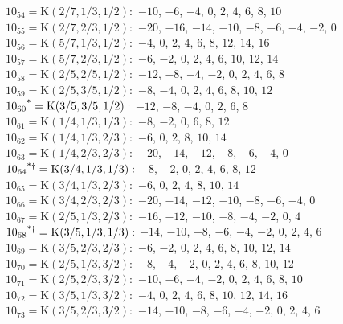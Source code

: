 $10_{54} = \mathrm{K}(2/7, 1/3, 1/2):$  $-10$, $-6$, $-4$, $0$, $2$, $4$, $6$, $8$, $10$\\ 
$10_{55} = \mathrm{K}(2/7, 2/3, 1/2):$  $-20$, $-16$, $-14$, $-10$, $-8$, $-6$, $-4$, $-2$, $0$\\ 
$10_{56} = \mathrm{K}(5/7, 1/3, 1/2):$  $-4$, $0$, $2$, $4$, $6$, $8$, $12$, $14$, $16$\\ 
$10_{57} = \mathrm{K}(5/7, 2/3, 1/2):$  $-6$, $-2$, $0$, $2$, $4$, $6$, $10$, $12$, $14$\\ 
$10_{58} = \mathrm{K}(2/5, 2/5, 1/2 ):$  $-12$, $-8$, $-4$, $-2$, $0$, $2$, $4$, $6$, $8$\\ 
$10_{59} = \mathrm{K}(2/5, 3/5, 1/2):$  $-8$, $-4$, $0$, $2$, $4$, $6$, $8$, $10$, $12$\\ 
$10_{60}\textsuperscript{*} = \mathrm{K}(3/5, 3/5, 1/2):$  $-12$, $-8$, $-4$, $0$, $2$, $6$, $8$\\ 
$10_{61} = \mathrm{K}(1/4, 1/3, 1/3):$  $-8$, $-2$, $0$, $6$, $8$, $12$\\ 
$10_{62} = \mathrm{K}(1/4, 1/3, 2/3):$  $-6$, $0$, $2$, $8$, $10$, $14$\\ 
$10_{63} = \mathrm{K}(1/4, 2/3, 2/3):$  $-20$, $-14$, $-12$, $-8$, $-6$, $-4$, $0$\\ 
$10_{64}\textsuperscript{*$\dagger$} = \mathrm{K}(3/4, 1/3, 1/3):$  $-8$, $-2$, $0$, $2$, $4$, $6$, $8$, $12$\\ 
$10_{65} = \mathrm{K}(3/4, 1/3, 2/3):$  $-6$, $0$, $2$, $4$, $8$, $10$, $14$\\ 
$10_{66} = \mathrm{K}(3/4, 2/3, 2/3):$  $-20$, $-14$, $-12$, $-10$, $-8$, $-6$, $-4$, $0$\\ 
$10_{67} = \mathrm{K}(2/5, 1/3, 2/3):$  $-16$, $-12$, $-10$, $-8$, $-4$, $-2$, $0$, $4$\\ 
$10_{68}\textsuperscript{*$\dagger$} = \mathrm{K}(3/5, 1/3, 1/3):$  $-14$, $-10$, $-8$, $-6$, $-4$, $-2$, $0$, $2$, $4$, $6$\\ 
$10_{69} = \mathrm{K}(3/5, 2/3, 2/3):$  $-6$, $-2$, $0$, $2$, $4$, $6$, $8$, $10$, $12$, $14$\\ 
$10_{70} = \mathrm{K}(2/5, 1/3, 3/2):$  $-8$, $-4$, $-2$, $0$, $2$, $4$, $6$, $8$, $10$, $12$\\ 
$10_{71} = \mathrm{K}(2/5, 2/3, 3/2):$  $-10$, $-6$, $-4$, $-2$, $0$, $2$, $4$, $6$, $8$, $10$\\ 
$10_{72} = \mathrm{K}(3/5, 1/3, 3/2):$  $-4$, $0$, $2$, $4$, $6$, $8$, $10$, $12$, $14$, $16$\\ 
$10_{73} = \mathrm{K}(3/5, 2/3, 3/2):$  $-14$, $-10$, $-8$, $-6$, $-4$, $-2$, $0$, $2$, $4$, $6$\\ 

